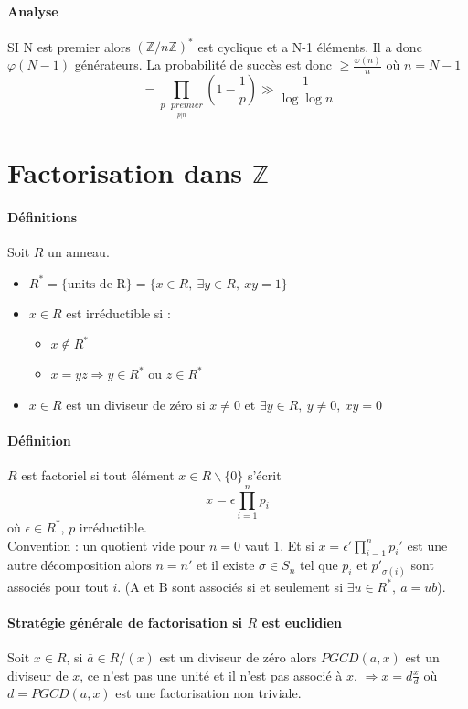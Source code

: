 \documentclass[12pt,a4paper]{report}
\begin{document}
\paragraph{Analyse\\}
SI N est premier alors $(\mathbb{Z}/n\mathbb{Z})^*$ est cyclique et a N-1 éléments. Il a donc $\varphi(N-1)$ générateurs. La probabilité de succès est donc $\geqslant \frac{\varphi(n)}{n}$ où $n=N-1$ \\
$$ = \prod_{\underset{p|n}{p \mbox{ }premier}} \left(1-\frac{1}{p}\right) \gg \frac{1}{\log \log n} $$

\section{Factorisation dans $\mathbb{Z}$}
\paragraph{Définitions\\}
Soit $R$ un anneau. 
\begin{itemize}
\item $R^*=\{\mbox{units de R}\}=\{x \in R,\ \exists y \in R,\ xy=1\} $
\item $x \in R$ est irréductible si :
\begin{itemize}
\item $x\not \in R^* $
\item $x=yz \Rightarrow y \in R^* $ ou $z \in R^* $
\end{itemize}
\item $x \in R$ est un diviseur de zéro si $x\neq 0$ et $\exists y \in R,\ y \neq 0,\ xy=0$
\end{itemize}
\paragraph{Définition\\}
$R$ est factoriel si tout élément $x \in R\backslash \{0\}$ s'écrit 
$$x= \epsilon \prod_{i=1}^n p_i $$
où $\epsilon \in R^*$, $p$ irréductible.\\
Convention : un quotient vide pour $n=0$ vaut 1. Et si $x=\epsilon ' \prod\limits_{i=1}^n p_i '$ est une autre décomposition alors $n=n'$ et il existe $\sigma \in S_n$ tel que $ p_i$ et $p'_{\sigma(i)}$ sont associés pour tout $i$. (A et B sont associés si et seulement si $\exists u \in R^*,\ a=ub $). \\
\paragraph{Stratégie générale de factorisation si $R$ est euclidien\\}
Soit $x \in R$, si $\bar{a} \in R/(x)$ est un diviseur de zéro alors $PGCD(a,x)$ est un diviseur de $x$, ce n'est pas une unité et il n'est pas associé à $x$. $\Rightarrow x = d \frac{x}{d}$ où $d=PGCD(a,x)$ est une factorisation non triviale.\\
\end{document}
